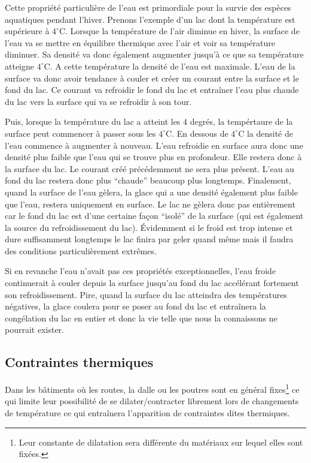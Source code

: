 \documentclass[a4paper,12pt]{book}
\newcommand{\C}{\mathrm{C}}
\begin{document}
Cette propriété particulière de l'eau est primordiale
pour la survie des espèces aquatiques pendant l'hiver. 
Prenons l'exemple d'un lac dont la température est supérieure à $4^\circ\C$. Lorsque la température de l'air diminue  en hiver,
la surface de l'eau va se mettre en équilibre thermique avec l'air et voir sa température diminuer. Sa densité
va donc également augmenter jusqu'à ce que sa température atteigne $4^\circ\C$. A cette température la densité de l'eau est maximale. L'eau de la surface va donc avoir tendance à couler
et créer un courant entre la surface et le fond du lac. Ce courant va refroidir le fond du lac et entraîner l'eau plus chaude du lac vers la surface qui va se refroidir à son tour.

Puis, lorsque la température du lac a atteint les $4$ degrés, 
la tempértaure de la surface peut commencer à passer sous les $4^\circ\C$. En dessous de $4^\circ\C$ la densité de l'eau commence à augmenter à nouveau. L'eau refroidie en surface aura donc une densité plus faible que l'eau qui se trouve plus en profondeur. Elle restera donc à la surface du lac. 
Le courant créé précédemment ne sera plus présent. L'eau au fond du lac restera donc plus ``chaude'' beaucoup plus longtemps.
Finalement, quand la surface de l'eau gèlera, la glace qui a une densité également plus faible que l'eau, restera uniquement en surface.
Le lac ne gèlera donc pas entièrement car le fond du lac est d'une certaine façon ``isolé'' de la surface (qui est également la source 
du refroidissement du lac). Évidemment si le froid est trop intense et dure suffisamment longtemps le lac finira par geler quand même
mais il faudra des conditions particulièrement extrêmes.

Si en revanche l'eau n'avait pas ces propriétés exceptionnelles, l'eau froide continuerait à couler depuis la surface jusqu'au fond du lac
accélérant fortement son refroidissement. Pire, quand la surface du lac atteindra des températures négatives, la glace coulera
pour se poser au fond du lac et entraînera la congélation du lac en entier et donc la vie telle que nous la connaissons ne pourrait exister.

\subsection{Contraintes thermiques}

Dans les bâtiments où les routes, la dalle ou les poutres sont en général fixes\footnote{Leur constante de dilatation sera différente du matériaux sur lequel elles sont fixées.} ce qui limite leur possibilité de se dilater/contracter librement lors de changements de température ce qui entraînera l'apparition de contraintes dites thermiques.
\end{document}
